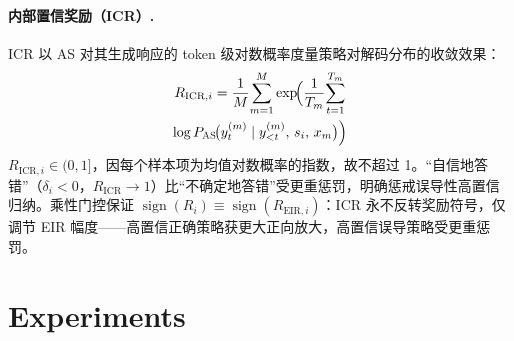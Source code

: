 \documentclass[11pt]{article}
\newcommand{\as}{\textnormal{\textsc{AS}}}
\begin{document}
\paragraph{内部置信奖励（ICR）.}
ICR 以 \as{} 对其生成响应的 token 级对数概率度量策略对解码分布的收敛效果：
\begin{multline}
  R_{\text{ICR},i} = \frac{1}{M}\!\sum_{m=1}^{M}
    \exp\!\Bigl(\frac{1}{T_m}\!\sum_{t=1}^{T_m}\\
    \log P_{\as{}}\!\bigl(y_t^{(m)} \mid y_{<t}^{(m)},\, s_i,\, x_m\bigr)\Bigr)
  \label{eq:icr}
\end{multline}
$R_{\text{ICR},i} \in (0,1]$，因每个样本项为均值对数概率的指数，故不超过 1。``自信地答错''（$\delta_i < 0$，$R_{\text{ICR}} {\to} 1$）比``不确定地答错''受更重惩罚，明确惩戒误导性高置信归纳。乘性门控保证 $\operatorname{sign}(R_i) \equiv \operatorname{sign}(R_{\text{EIR},i})$：ICR 永不反转奖励符号，仅调节 EIR 幅度——高置信正确策略获更大正向放大，高置信误导策略受更重惩罚。

\section{Experiments}
\label{sec:experiments}
\end{document}
